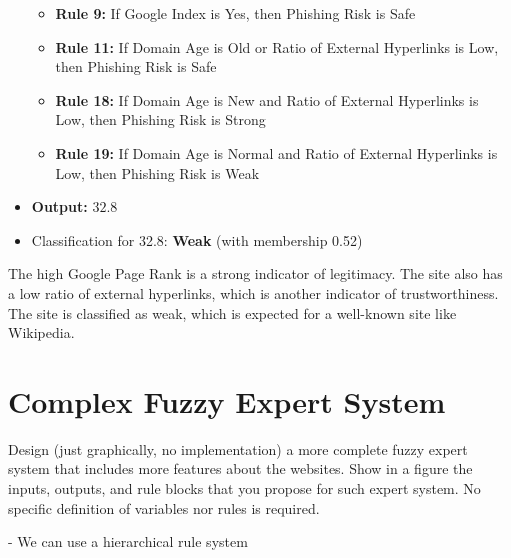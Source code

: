 \documentclass[11pt]{article}
\begin{document}
\begin{itemize}
\begin{itemize}
        \item \textbf{Rule 9:} If Google Index is Yes, then Phishing Risk is Safe
        \item \textbf{Rule 11:} If Domain Age is Old or Ratio of External Hyperlinks is Low, then Phishing Risk is Safe
        \item \textbf{Rule 18:} If Domain Age is New and Ratio of External Hyperlinks is Low, then Phishing Risk is Strong
        \item \textbf{Rule 19:} If Domain Age is Normal and Ratio of External Hyperlinks is Low, then Phishing Risk is Weak
    \end{itemize}
    \item \textbf{Output:} $32.8$
    \item Classification for 32.8: \textbf{Weak} (with membership 0.52)
\end{itemize}

The high Google Page Rank is a strong indicator of legitimacy. The site also has a low ratio of external hyperlinks, which is another indicator of trustworthiness. The site is classified as weak, which is expected for a well-known site like Wikipedia.

\section{Complex Fuzzy Expert System}
Design (just graphically, no implementation) a more complete fuzzy expert system that 
includes more features about the websites. Show in a figure the inputs, outputs, and rule blocks 
that you propose for such expert system. No specific definition of variables nor rules is required. 

- We can use a hierarchical rule system

\newpage
\printbibliography
\end{document}
